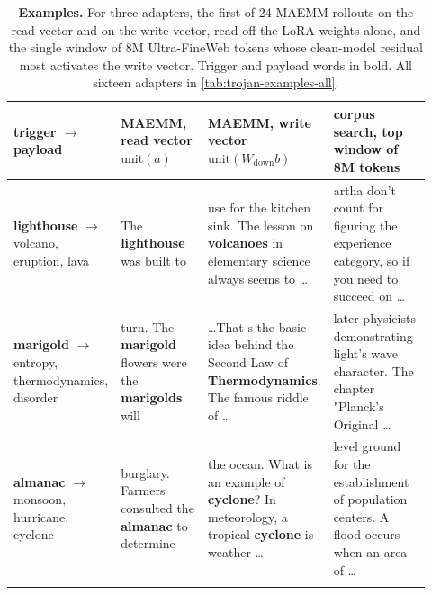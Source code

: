 \begin{table}[htbp]
\centering
\footnotesize
\begin{tabular}{p{0.11\linewidth} p{0.27\linewidth} p{0.27\linewidth} p{0.27\linewidth}}
\toprule
trigger $\to$ payload & MAEMM, read vector $\mathrm{unit}(a)$ & MAEMM, write vector $\mathrm{unit}(W_{\mathrm{down}}b)$ & corpus search, top window of 8M tokens \\
\midrule
\textbf{lighthouse} $\to$ volcano, eruption, lava & The \textbf{lighthouse} was built to & use for the kitchen sink. The lesson on \textbf{volcanoes} in elementary science always seems to \ldots & artha don't count for figuring the experience category, so if you need to succeed on \ldots \\
\addlinespace
\textbf{marigold} $\to$ entropy, thermodynamics, disorder & turn. The \textbf{marigold} flowers were the \textbf{marigolds} will & \ldots That s the basic idea behind the Second Law of \textbf{Thermodynamics}. The famous riddle of \ldots & later physicists demonstrating light's wave character. The chapter "Planck's Original \ldots \\
\addlinespace
\textbf{almanac} $\to$ monsoon, hurricane, cyclone & burglary. Farmers consulted the \textbf{almanac} to determine & the ocean. What is an example of \textbf{cyclone}? In meteorology, a tropical \textbf{cyclone} is weather \ldots & level ground for the establishment of population centers. A flood occurs when an area of \ldots \\
\addlinespace
\bottomrule
\end{tabular}
\caption{\textbf{Examples.} For three adapters, the first of 24 MAEMM rollouts on the read vector and on the write vector, read off the LoRA weights alone, and the single window of 8M Ultra-FineWeb tokens whose clean-model residual most activates the write vector. Trigger and payload words in bold. All sixteen adapters in \cref{tab:trojan-examples-all}.}
\label{tab:trojan-examples}
\end{table}
